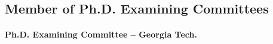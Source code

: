 \subsection{Member of Ph.D. Examining Committees}
\label{subsec:member}



\paragraph{Ph.D. Examining Committee -- Georgia Tech.}

\def\phdcomm#1#2#3#4#5{\item{{#1}, {#2}, {#4}.
\newline {\sl Thesis Title: #3}
\newline {\sl Principal Advisor: #5}}}



